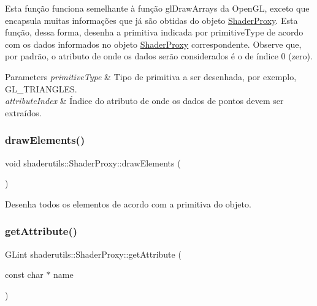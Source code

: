 Esta função funciona semelhante à função gl\+Draw\+Arrays da Open\+GL, exceto que encapsula muitas informações que já são obtidas do objeto \mbox{\hyperlink{classshaderutils_1_1_shader_proxy}{Shader\+Proxy}}. Esta função, dessa forma, desenha a primitiva indicada por {\ttfamily primitive\+Type} de acordo com os dados informados no objeto \mbox{\hyperlink{classshaderutils_1_1_shader_proxy}{Shader\+Proxy}} correspondente. Observe que, por padrão, o atributo de onde os dados serão considerados é o de índice 0 (zero). 
\begin{DoxyParams}{Parameters}
{\em primitive\+Type} & Tipo de primitiva a ser desenhada, por exemplo, G\+L\+\_\+\+T\+R\+I\+A\+N\+G\+L\+ES. \\
\hline
{\em attribute\+Index} & Índice do atributo de onde os dados de pontos devem ser extraídos. \\
\hline
\end{DoxyParams}
\mbox{\label{classshaderutils_1_1_shader_proxy_a3b2b201f82d2cbfb814b2d582a73c9e5}} 
\subsubsection{\texorpdfstring{draw\+Elements()}{drawElements()}}
{\footnotesize\ttfamily void shaderutils\+::\+Shader\+Proxy\+::draw\+Elements (\begin{DoxyParamCaption}{ }\end{DoxyParamCaption})\hspace{0.3cm}{\ttfamily [inline]}}

Desenha todos os elementos de acordo com a primitiva do objeto. \mbox{\label{classshaderutils_1_1_shader_proxy_aa30751bc64ecc5da76d66a17a2a10ecd}} 
\subsubsection{\texorpdfstring{get\+Attribute()}{getAttribute()}}
{\footnotesize\ttfamily G\+Lint shaderutils\+::\+Shader\+Proxy\+::get\+Attribute (\begin{DoxyParamCaption}\item[{const char $\ast$}]{name }\end{DoxyParamCaption})\hspace{0.3cm}{\ttfamily [inline]}}


